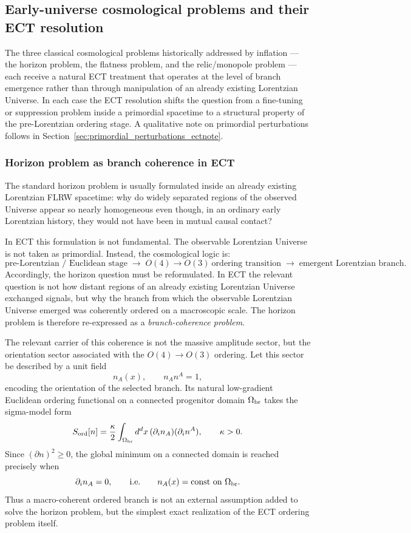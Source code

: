 \documentclass[11pt,a4paper]{article}
\numberwithin{equation}{section}
\begin{document}
\subsection*{Early-universe cosmological problems and their ECT resolution}
\label{sec:inflation_alternatives}

The three classical cosmological problems historically addressed by
inflation --- the horizon problem, the flatness problem, and the
relic/monopole problem --- each receive a natural ECT treatment that
operates at the level of branch emergence rather than through
manipulation of an already existing Lorentzian Universe.
In each case the ECT resolution shifts the question from a fine-tuning
or suppression problem inside a primordial spacetime to a structural
property of the pre-Lorentzian ordering stage.
A qualitative note on primordial perturbations follows in
Section~\ref{sec:primordial_perturbations_ectnote}.

\subsubsection*{Horizon problem as branch coherence in ECT}
\label{sec:horizon_ect_main}

The standard horizon problem is usually formulated inside an already
existing Lorentzian FLRW spacetime: why do widely separated regions of
the observed Universe appear so nearly homogeneous even though, in an
ordinary early Lorentzian history, they would not have been in mutual
causal contact?

In ECT this formulation is not fundamental.
The observable Lorentzian Universe is not taken as primordial.
Instead, the cosmological logic is:
\[
\text{pre-Lorentzian / Euclidean stage}
\;\longrightarrow\;
O(4)\to O(3)\ \text{ordering transition}
\;\longrightarrow\;
\text{emergent Lorentzian branch}.
\]
Accordingly, the horizon question must be reformulated.
In ECT the relevant question is not how distant regions of an already
existing Lorentzian Universe exchanged signals, but why the branch from
which the observable Lorentzian Universe emerged was coherently ordered
on a macroscopic scale.
The horizon problem is therefore re-expressed as a
\emph{branch-coherence problem}.

The relevant carrier of this coherence is not the massive amplitude
sector, but the orientation sector associated with the
$O(4)\to O(3)$ ordering.
Let this sector be described by a unit field
\[
n_A(x),\qquad n_A n^A = 1,
\]
encoding the orientation of the selected branch.
Its natural low-gradient Euclidean ordering functional on a connected
progenitor domain $\Omega_{\rm br}$ takes the sigma-model form
\begin{equation}
\label{eq:horizon_sigma_main}
S_{\rm ord}[n]
=
\frac{\kappa}{2}
\int_{\Omega_{\rm br}} d^d x\,
(\partial_i n_A)(\partial_i n^A),
\qquad
\kappa>0.
\end{equation}
Since $(\partial n)^2\ge 0$, the global minimum on a connected domain is
reached precisely when
\[
\partial_i n_A = 0,
\qquad\text{i.e.}\qquad
n_A(x)=\text{const on }\Omega_{\rm br}.
\]
Thus a macro-coherent ordered branch is not an external assumption added
to solve the horizon problem, but the simplest exact realization of the
ECT ordering problem itself.
\end{document}
